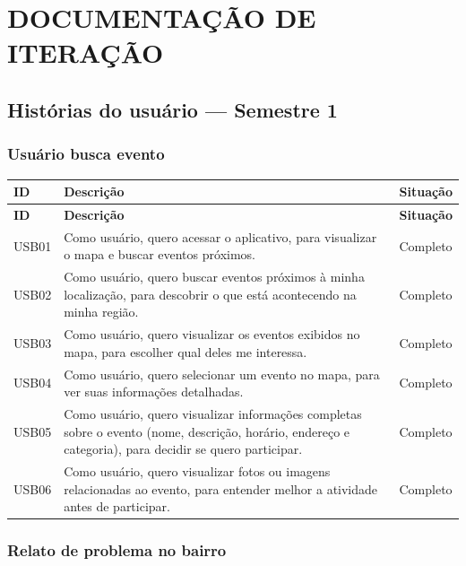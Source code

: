 
\section{DOCUMENTAÇÃO DE ITERAÇÃO}

\subsection{Histórias do usuário — Semestre 1}

\subsubsection{Usuário busca evento}

\begin{longtable}{|p{2cm}|p{9cm}|p{2.5cm}|}
  \hline
  \textbf{ID} & \textbf{Descrição} & \textbf{Situação} \\
  \hline
  \endfirsthead
  \hline
  \textbf{ID} & \textbf{Descrição} & \textbf{Situação} \\
  \hline
  \endhead
  USB01 & Como usuário, quero acessar o aplicativo, para visualizar o mapa e buscar eventos próximos. & Completo \\
  \hline
  USB02 & Como usuário, quero buscar eventos próximos à minha localização, para descobrir o que está acontecendo na minha região. & Completo \\
  \hline
  USB03 & Como usuário, quero visualizar os eventos exibidos no mapa, para escolher qual deles me interessa. & Completo \\
  \hline
  USB04 & Como usuário, quero selecionar um evento no mapa, para ver suas informações detalhadas. & Completo \\
  \hline
  USB05 & Como usuário, quero visualizar informações completas sobre o evento (nome, descrição, horário, endereço e categoria), para decidir se quero participar. & Completo \\
  \hline
  USB06 & Como usuário, quero visualizar fotos ou imagens relacionadas ao evento, para entender melhor a atividade antes de participar. & Completo \\
  \hline
\end{longtable}

\subsubsection{Relato de problema no bairro}

